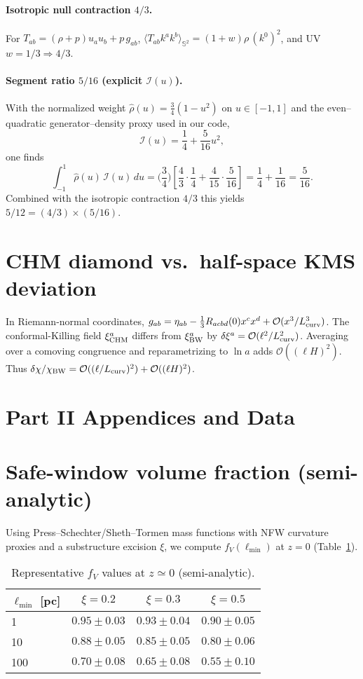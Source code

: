 \documentclass[aps,prd,onecolumn,superscriptaddress,nofootinbib]{revtex4-2}
\begin{document}
\paragraph{Isotropic null contraction \(4/3\).} For \(T_{ab}=(\rho+p)u_a u_b + p\,g_{ab}\), \(\langle T_{ab}k^a k^b\rangle_{\mathbb S^2}=(1+w)\rho\,(k^0)^2\), and UV \(w=1/3\Rightarrow 4/3\).

\paragraph{Segment ratio \(5/16\) (explicit \(\mathcal I(u)\)).}
With the normalized weight \(\hat\rho(u)=\tfrac{3}{4}(1-u^2)\) on \(u\in[-1,1]\) and the even–quadratic generator–density proxy used in our code,
\[
\mathcal I(u)=\frac{1}{4}+\frac{5}{16}u^2,
\]
one finds
\[
\int_{-1}^{1}\! \hat\rho(u)\,\mathcal I(u)\,du
=\Big(\frac{3}{4}\Big)\!\left[\frac{4}{3}\cdot\frac{1}{4}+\frac{4}{15}\cdot\frac{5}{16}\right]
=\frac{1}{4}+\frac{1}{16}
=\frac{5}{16}.
\]
Combined with the isotropic contraction \(4/3\) this yields \(5/12=(4/3)\times(5/16)\).

\section{CHM diamond vs.\ half-space KMS deviation}
\label{app:chm-kms-estimate}
In Riemann-normal coordinates,
\(g_{ab}=\eta_{ab}-\tfrac{1}{3}R_{acbd}(0)x^c x^d+\mathcal O(x^3/L_{\rm curv}^3)\).
The conformal-Killing field \(\xi^a_{\rm CHM}\) differs from \(\xi^a_{\rm BW}\) by \(\delta\xi^a=\mathcal O(\ell^2/L_{\rm curv}^2)\).
Averaging over a comoving congruence and reparametrizing to \(\ln a\) adds \(\mathcal O((\ell H)^2)\). Thus
\(\delta\chi/\chi_{\rm BW}=\mathcal O((\ell/L_{\rm curv})^2)+\mathcal O((\ell H)^2)\).

\section*{Part II Appendices and Data}

\section{Safe-window volume fraction (semi-analytic)}
\label{app:fv}
Using Press–Schechter/Sheth–Tormen mass functions with NFW curvature proxies and a substructure excision \(\xi\), we compute \(f_V(\ell_{\min})\) at \(z\!=\!0\) (Table~\ref{tab:fV}).

\begin{table}[b]
\centering
\caption{Representative \(f_V\) values at \(z\simeq 0\) (semi-analytic).}
\label{tab:fV}
\begin{tabular}{lccc}
\toprule
\(\ell_{\min}\) [pc] & \(\xi=0.2\) & \(\xi=0.3\) & \(\xi=0.5\) \\
\midrule
1   & \(0.95\pm0.03\) & \(0.93\pm0.04\) & \(0.90\pm0.05\) \\
10  & \(0.88\pm0.05\) & \(0.85\pm0.05\) & \(0.80\pm0.06\) \\
100 & \(0.70\pm0.08\) & \(0.65\pm0.08\) & \(0.55\pm0.10\) \\
\bottomrule
\end{tabular}
\end{table}
\end{document}
